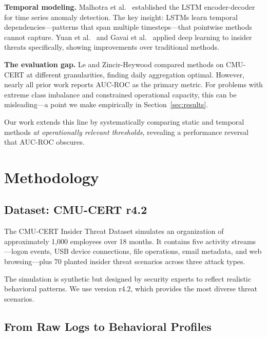 \documentclass[conference]{IEEEtran}
\begin{document}
\textbf{Temporal modeling.} Malhotra et al.\ \cite{malhotra2016lstm} established the LSTM encoder-decoder for time series anomaly detection. The key insight: LSTMs learn temporal dependencies---patterns that span multiple timesteps---that pointwise methods cannot capture. Yuan et al.\ \cite{yuan2021insider} and Gavai et al.\ \cite{gavai2015detecting} applied deep learning to insider threats specifically, showing improvements over traditional methods.

\textbf{The evaluation gap.} Le and Zincir-Heywood \cite{le2020analyzing} compared methods on CMU-CERT at different granularities, finding daily aggregation optimal. However, nearly all prior work reports AUC-ROC as the primary metric. For problems with extreme class imbalance and constrained operational capacity, this can be misleading---a point we make empirically in Section~\ref{sec:results}.

Our work extends this line by systematically comparing static and temporal methods \textit{at operationally relevant thresholds}, revealing a performance reversal that AUC-ROC obscures.

\section{Methodology}
\label{sec:methodology}

\subsection{Dataset: CMU-CERT r4.2}
\label{sec:dataset}

The CMU-CERT Insider Threat Dataset \cite{glasser2013bridging} simulates an organization of approximately 1,000 employees over 18 months. It contains five activity streams---logon events, USB device connections, file operations, email metadata, and web browsing---plus 70 planted insider threat scenarios across three attack types.

The simulation is synthetic but designed by security experts to reflect realistic behavioral patterns. We use version r4.2, which provides the most diverse threat scenarios.

\subsection{From Raw Logs to Behavioral Profiles}
\label{sec:features}
\end{document}

